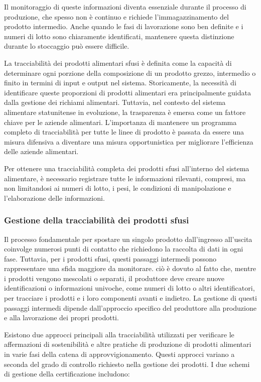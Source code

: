 Il monitoraggio di queste informazioni diventa essenziale durante il processo di produzione, che spesso non è continuo e richiede l'immagazzinamento del prodotto intermedio. Anche quando le fasi di lavorazione sono ben definite e i numeri di lotto sono chiaramente identificati, mantenere questa distinzione durante lo stoccaggio può essere difficile.

La tracciabilità dei prodotti alimentari sfusi è definita come la capacità di determinare ogni porzione della composizione di un prodotto grezzo, intermedio o finito in termini di input e output nel sistema. Storicamente, la necessità di identificare queste proporzioni di prodotti alimentari era principalmente guidata dalla gestione dei richiami alimentari. Tuttavia, nel contesto del sistema alimentare statunitense in evoluzione, la trasparenza è emersa come un fattore chiave per le aziende alimentari. L'importanza di mantenere un programma completo di tracciabilità per tutte le linee di prodotto è passata da essere una misura difensiva a diventare una misura opportunistica per migliorare l'efficienza delle aziende alimentari.

Per ottenere una tracciabilità completa dei prodotti sfusi all'interno del sistema alimentare, è necessario registrare tutte le informazioni rilevanti, compresi, ma non limitandosi ai numeri di lotto, i pesi, le condizioni di manipolazione e l'elaborazione delle informazioni.

\subsubsection{Gestione della tracciabilità dei prodotti sfusi}

Il processo fondamentale per spostare un singolo prodotto dall'ingresso all'uscita coinvolge numerosi punti di contatto che richiedono la raccolta di dati in ogni fase. Tuttavia, per i prodotti sfusi, questi passaggi intermedi possono rappresentare una sfida maggiore da monitorare. ciò è dovuto al fatto che, mentre i prodotti vengono mescolati o separati, il produttore deve creare nuove identificazioni o informazioni univoche, come numeri di lotto o altri identificatori, per tracciare i prodotti e i loro componenti avanti e indietro. La gestione di questi passaggi intermedi dipende dall'approccio specifico del produttore alla produzione e alla lavorazione dei propri prodotti.

Esistono due approcci principali alla tracciabilità utilizzati per verificare le affermazioni di sostenibilità e altre pratiche di produzione di prodotti alimentari in varie fasi della catena di approvvigionamento. Questi approcci variano a seconda del grado di controllo richiesto nella gestione dei prodotti. I due schemi di gestione della certificazione includono:

